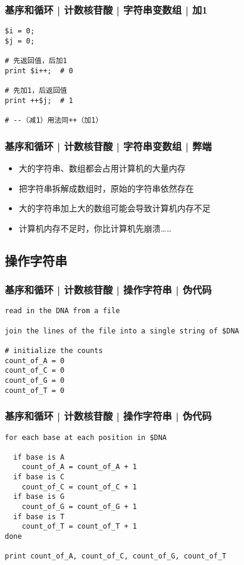 \begin{frame}[fragile]
  \frametitle{基序和循环 | 计数核苷酸 | 字符串变数组 | \alert{加1}}
\begin{lstlisting}
$i = 0;
$j = 0;

# 先返回值，后加1
print $i++;  # 0

# 先加1，后返回值
print ++$j;  # 1

# --（减1）用法同++（加1）
\end{lstlisting}
\end{frame}

\begin{frame}
  \frametitle{基序和循环 | 计数核苷酸 | 字符串变数组 | 弊端}
  \begin{itemize}
    \item 大的字符串、数组都会占用计算机的大量内存
    \item 把字符串拆解成数组时，原始的字符串依然存在
    \item 大的字符串加上大的数组可能会导致计算机内存不足
    \item 计算机内存不足时，你比计算机先崩溃……
  \end{itemize}
\end{frame}

\subsection{操作字符串}
\begin{frame}[fragile]
  \frametitle{基序和循环 | 计数核苷酸 | 操作字符串 | 伪代码}
\begin{lstlisting}
read in the DNA from a file

join the lines of the file into a single string of $DNA

# initialize the counts
count_of_A = 0
count_of_C = 0
count_of_G = 0
count_of_T = 0
\end{lstlisting}
\end{frame}

\begin{frame}[fragile]
  \frametitle{基序和循环 | 计数核苷酸 | 操作字符串 | 伪代码}
\begin{lstlisting}
for each base at each position in $DNA

  if base is A
    count_of_A = count_of_A + 1
  if base is C
    count_of_C = count_of_C + 1
  if base is G
    count_of_G = count_of_G + 1
  if base is T
    count_of_T = count_of_T + 1
done

print count_of_A, count_of_C, count_of_G, count_of_T
\end{lstlisting}
\end{frame}

